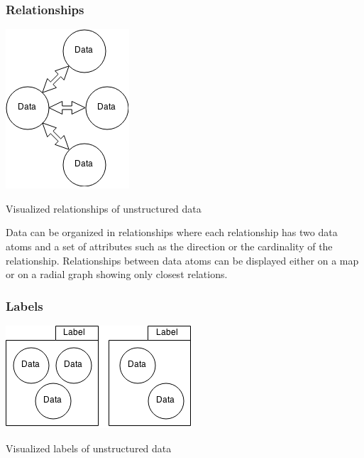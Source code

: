 \subsubsection{Relationships}

\begin{flfigure}
  \centering
    \includegraphics[width=0.5\linewidth]{00_resources/data_relationships.png}
    \caption{Visualized relationships of unstructured data}
  \label{fig:visualrelationships}
\end{flfigure}

Data can be organized in relationships where each relationship has two data atoms and a set of attributes such as the direction or the cardinality of the relationship. Relationships between data atoms can be displayed either on a map or on a radial graph showing only closest relations.

\subsubsection{Labels}

\begin{flfigure}
  \centering
    \includegraphics[width=0.5\linewidth]{00_resources/data_labels.png}
    \caption{Visualized labels of unstructured data}
  \label{fig:visuallabels}
\end{flfigure}

